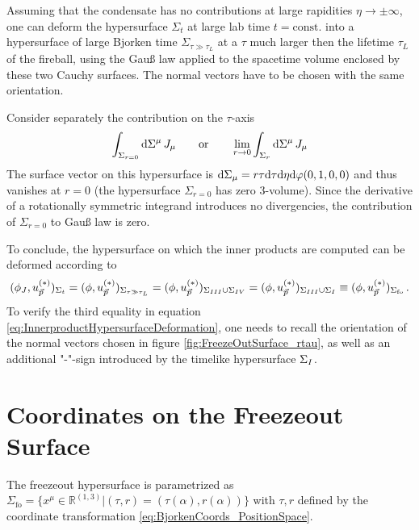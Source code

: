 Assuming that the condensate has no contributions at large rapidities $\eta\to\pm\infty$, one can deform the hypersurface $\Sigma_t$ at large lab time $t=\text{const.}$ into a hypersurface of large Bjorken time $\Sigma_{\tau\gg\tau_L}$ at a $\tau$ much larger then the lifetime $\tau_L$ of the fireball, using the Gauß law applied to the spacetime volume enclosed by these two Cauchy surfaces. The normal vectors have to be chosen with the same orientation.

Consider separately the contribution on the $\tau$-axis
\begin{equation*}
    \int_{\Sigma_{r=0}}\text{d}\Sigma^\mu\,J_\mu\qquad\text{or}\qquad\lim_{r\to 0}\int_{\Sigma_{r}}\text{d}\Sigma^\mu\,J_\mu
\end{equation*}
The surface vector on this hypersurface is $\text{d}\Sigma_\mu=r\tau\text{d}\tau\text{d}\eta\text{d}\varphi(0,1,0,0)$ and thus vanishes at $r=0$ (the hypersurface $\Sigma_{r=0}$ has zero $3$-volume). Since the derivative of a rotationally symmetric integrand introduces no divergencies, the contribution of $\Sigma_{r=0}$ to Gauß law is zero.

To conclude, the hypersurface on which the inner products are computed can be deformed according to
\begin{equation}
    (\phi_J,u_{\vec{p}}^{(*)})_{\Sigma_t}=(\phi,u_{\vec{p}}^{(*)})_{\Sigma_{\tau\gg\tau_L}}=(\phi,u_{\vec{p}}^{(*)})_{\Sigma_{\rom{3}}\cup\Sigma_{\rom{4}}}=(\phi,u_{\vec{p}}^{(*)})_{\Sigma_{\rom{3}}\cup\Sigma_{\rom{1}}}\equiv(\phi,u_{\vec{p}}^{(*)})_{\Sigma_{\text{fo}}}\,.
    \label{eq:InnerproductHypersurfaceDeformation}
\end{equation}
To verify the third equality in equation \ref{eq:InnerproductHypersurfaceDeformation}, one needs to recall the orientation of the normal vectors chosen in figure \ref{fig:FreezeOutSurface_rtau}, as well as an additional "-"-sign introduced by the timelike hypersurface $\Sigma_{\rom{1}}$.

\section{Coordinates on the Freezeout Surface}

The freezeout hypersurface is parametrized as $\Sigma_{\text{fo}}=\{x^\mu\in\mathbb{R}^{(1,3)}\vert (\tau,r)=(\tau(\alpha),r(\alpha))\}$ with $\tau,r$ defined by the coordinate transformation \eqref{eq:BjorkenCoords_PositionSpace}.

